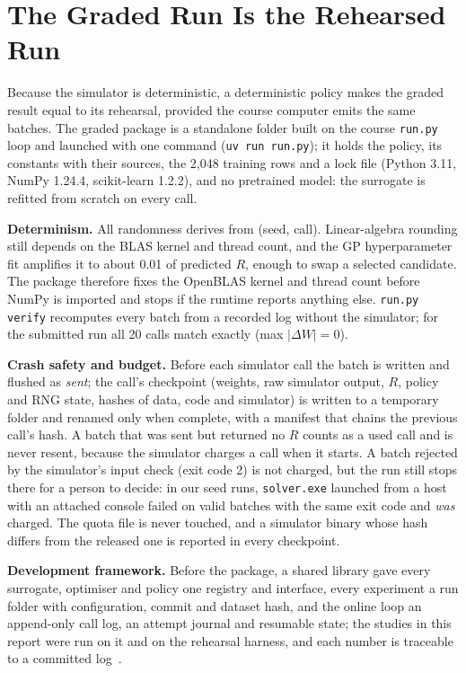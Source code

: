 \section{The Graded Run Is the Rehearsed Run}
\label{sec:runner}
Because the simulator is deterministic, a deterministic policy makes the graded result equal to its rehearsal,
provided the course computer emits the same batches. The graded package is a standalone folder built on the course
\texttt{run.py} loop and launched with one command (\texttt{uv run run.py}); it holds the policy, its constants with
their sources, the 2,048 training rows and a lock file (Python 3.11, NumPy 1.24.4, scikit-learn 1.2.2), and no
pretrained model: the surrogate is refitted from scratch on every call.

\textbf{Determinism.} All randomness derives from (seed, call). Linear-algebra rounding still depends on the BLAS
kernel and thread count, and the GP hyperparameter fit amplifies it to about 0.01 of predicted $R$, enough to swap a
selected candidate. The package therefore fixes the OpenBLAS kernel and thread count before NumPy is imported and stops
if the runtime reports anything else. \texttt{run.py verify} recomputes every batch from a recorded log without the
simulator; for the submitted run all 20 calls match exactly (max $|\Delta W|=0$).

\textbf{Crash safety and budget.} Before each simulator call the batch is written and flushed as \emph{sent}; the
call's checkpoint (weights, raw simulator output, $R$, policy and RNG state, hashes of data, code and simulator) is
written to a temporary folder and renamed only when complete, with a manifest that chains the previous call's hash. A
batch that was sent but returned no $R$ counts as a used call and is never resent, because the simulator charges a call
when it starts. A batch rejected by the simulator's input check (exit code 2) is not charged, but the run still stops
there for a person to decide: in our seed runs, \texttt{solver.exe} launched from a host with an attached console failed
on valid batches with the same exit code and \emph{was} charged. The quota file is never touched, and a simulator
binary whose hash differs from the released one is reported in every checkpoint.

\textbf{Development framework.} Before the package, a shared library gave every surrogate, optimiser and policy one
registry and interface, every experiment a run folder with configuration, commit and dataset hash, and the online loop
an append-only call log, an attempt journal and resumable state; the studies in this report were run on it and on the
rehearsal harness, and each number is traceable to a committed log~\cite{repo}.
